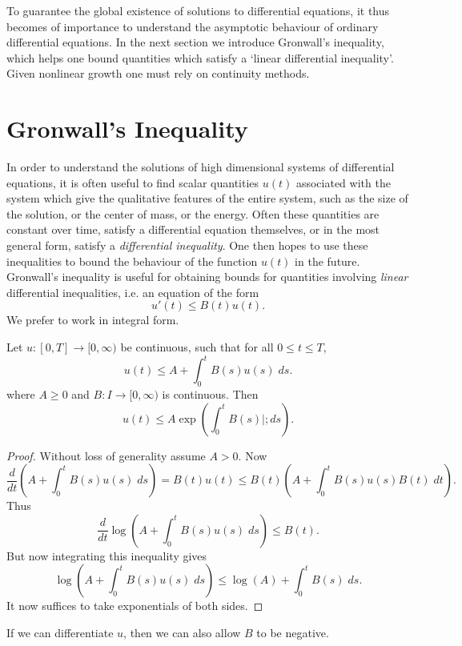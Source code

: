 To guarantee the global existence of solutions to differential equations, it thus becomes of importance to understand the asymptotic behaviour of ordinary differential equations. In the next section we introduce Gronwall's inequality, which helps one bound quantities which satisfy a `linear differential inequality'. Given nonlinear growth one must rely on continuity methods.

\section{Gronwall's Inequality}

In order to understand the solutions of high dimensional systems of differential equations, it is often useful to find scalar quantities $u(t)$ associated with the system which give the qualitative features of the entire system, such as the size of the solution, or the center of mass, or the energy. Often these quantities are constant over time, satisfy a differential equation themselves, or in the most general form, satisfy a \emph{differential inequality}. One then hopes to use these inequalities to bound the behaviour of the function $u(t)$ in the future. Gronwall's inequality is useful for obtaining bounds for quantities involving \emph{linear} differential inequalities, i.e. an equation of the form
%
\[ u'(t) \leq B(t) u(t). \]
%
We prefer to work in integral form.

\begin{theorem}
    Let $u: [0,T] \to [0,\infty)$ be continuous, such that for all $0 \leq t \leq T$,
    \[ u(t) \leq A + \int_0^t B(s) u(s)\; ds. \]
    where $A \geq 0$ and $B: I \to [0,\infty)$ is continuous. Then
    \[ u(t) \leq A \exp \left( \int_0^t B(s)|; ds \right). \]
\end{theorem}
\begin{proof}
    Without loss of generality assume $A > 0$. Now
    \[ \frac{d}{dt} \left( A + \int_0^t B(s) u(s)\; ds \right) = B(t)u(t) \leq B(t) \left( A + \int_0^t B(s) u(s) B(t)\; dt \right). \]
    Thus
    \[ \frac{d}{dt} \log \left( A + \int_0^t B(s)u(s)\; ds \right) \leq B(t). \]
    But now integrating this inequality gives
    \[ \log \left( A + \int_0^t B(s)u(s)\; ds \right) \leq \log(A) + \int_0^t B(s)\; ds. \]
    It now suffices to take exponentials of both sides.
\end{proof}

If we can differentiate $u$, then we can also allow $B$ to be negative.

